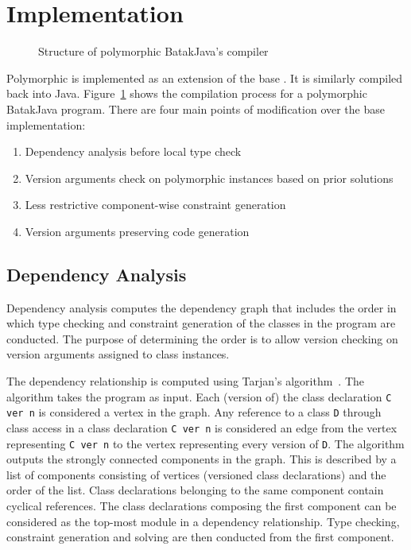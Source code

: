 \section{Implementation}

\begin{figure}[h]
\caption{Structure of polymorphic BatakJava's compiler}
\label{poly-bj-overview}
\end{figure}

Polymorphic \lang{} is implemented as an extension of the base \lang{}. 
It is similarly compiled back into Java. 
Figure~\ref{poly-bj-overview} shows the compilation process for a polymorphic BatakJava program. 
There are four main points of modification over the base implementation:
\begin{enumerate}
\item Dependency analysis before local type check
\item Version arguments check on polymorphic instances based on prior solutions
\item Less restrictive component-wise constraint generation
\item Version arguments preserving code generation
\end{enumerate}

\subsection{Dependency Analysis}

Dependency analysis computes the dependency graph that includes the order in which type checking and constraint generation 
of the classes in the program are conducted. The purpose of determining the order is to allow version checking on version 
arguments assigned to class instances.

The dependency relationship is computed using Tarjan’s algorithm~\cite{tarjan1972depth}. 
The algorithm takes the program as input. 
Each (version of) the class declaration \texttt{C ver n} is considered a vertex in the graph. 
Any reference to a class \texttt{D} through class access in a class declaration \texttt{C ver n} 
is considered an edge from the vertex representing \texttt{C ver n} to the vertex representing 
every version of \texttt{D}.
The algorithm outputs the strongly connected components in the graph.
This is described by a list of components consisting of vertices (versioned class declarations) 
and the order of the list. 
Class declarations belonging to the same component contain cyclical references.
The class declarations composing the first component can be considered as the top-most 
module in a dependency relationship. 
Type checking, constraint generation and solving are 
then conducted from the first component.

